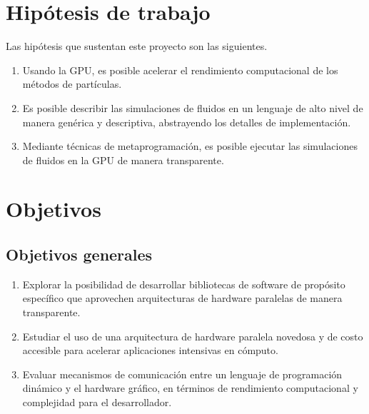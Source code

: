 \documentclass[11pt,spanish]{article}
\begin{document}
\newpage
\section{Hipótesis de trabajo}
Las hipótesis que sustentan este proyecto son las siguientes.
\begin{enumerate}
    \item Usando la GPU, es posible acelerar el rendimiento computacional de los
        métodos de partículas.
    \item Es posible describir las simulaciones de fluidos en un lenguaje de
        alto nivel de manera genérica y descriptiva, abstrayendo los detalles de
        implementación.
    \item Mediante técnicas de metaprogramación, es posible ejecutar las
        simulaciones de fluidos en la GPU de manera transparente.
\end{enumerate}

\section{Objetivos }

\subsection{Objetivos generales}
\begin{enumerate}
    \item Explorar la posibilidad de desarrollar bibliotecas de software de
        propósito específico que aprovechen arquitecturas de hardware paralelas
        de manera transparente.
    \item Estudiar el uso de una arquitectura de hardware paralela novedosa y de
        costo accesible para acelerar aplicaciones intensivas en cómputo.
    \item Evaluar mecanismos de comunicación entre un lenguaje de programación
        dinámico y el hardware gráfico, en términos de rendimiento computacional y
        complejidad para el desarrollador.
\end{enumerate}
\end{document}
